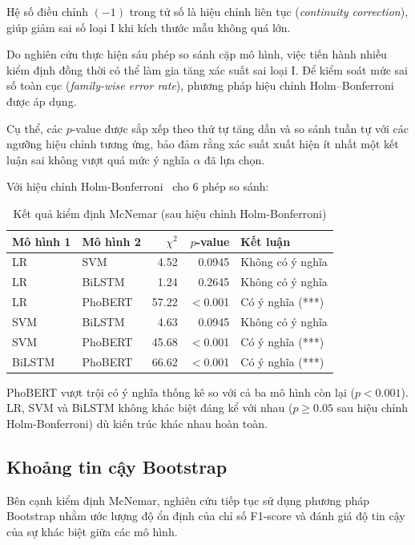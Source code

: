 \documentclass[12pt, a4paper]{report}
\newcommand{\phobert}{PhoBERT\xspace}
\newcommand{\mcnLrSvmChi}{4.52}
\newcommand{\mcnLrSvmP}{0.0945}
\newcommand{\mcnLrBilstmChi}{1.24}
\newcommand{\mcnLrBilstmP}{0.2645}
\newcommand{\mcnLrPhobertChi}{57.22}
\newcommand{\mcnSvmBilstmChi}{4.63}
\newcommand{\mcnSvmBilstmP}{0.0945}
\newcommand{\mcnSvmPhobertChi}{45.68}
\newcommand{\mcnBilstmPhobertChi}{66.62}
\begin{document}
Hệ số điều chỉnh $(-1)$ trong tử số là hiệu chỉnh liên tục 
(\textit{continuity correction}), giúp giảm sai số loại I 
khi kích thước mẫu không quá lớn.

Do nghiên cứu thực hiện sáu phép so sánh cặp mô hình, việc tiến hành nhiều kiểm định 
đồng thời có thể làm gia tăng xác suất sai loại I. 
Để kiểm soát mức sai số toàn cục (\textit{family-wise error rate}), 
phương pháp hiệu chỉnh Holm--Bonferroni được áp dụng.

Cụ thể, các $p$-value được sắp xếp theo thứ tự tăng dần và so sánh tuần tự 
với các ngưỡng hiệu chỉnh tương ứng, bảo đảm rằng xác suất xuất hiện ít nhất 
một kết luận sai không vượt quá mức ý nghĩa $\alpha$ đã lựa chọn.

Với hiệu chỉnh Holm-Bonferroni~\cite{holm1979} cho 6 phép so sánh:

\begin{table}[H]
\centering
\caption{Kết quả kiểm định McNemar (sau hiệu chỉnh Holm-Bonferroni)}
\label{tab:mcnemar}
\begin{tabular}{llrrl}
\toprule
\textbf{Mô hình 1} & \textbf{Mô hình 2} & \textbf{$\chi^2$} & \textbf{$p$-value} & \textbf{Kết luận} \\
\midrule
LR      & SVM     & \mcnLrSvmChi  & \mcnLrSvmP    & Không có ý nghĩa \\
LR      & BiLSTM  & \mcnLrBilstmChi  & \mcnLrBilstmP    & Không có ý nghĩa \\
LR      & PhoBERT & \mcnLrPhobertChi & $<$0.001  & Có ý nghĩa (***) \\
SVM     & BiLSTM  & \mcnSvmBilstmChi  & \mcnSvmBilstmP    & Không có ý nghĩa \\
SVM     & PhoBERT & \mcnSvmPhobertChi & $<$0.001  & Có ý nghĩa (***) \\
BiLSTM  & PhoBERT & \mcnBilstmPhobertChi & $<$0.001  & Có ý nghĩa (***) \\
\bottomrule
\end{tabular}
\end{table}

\phobert vượt trội có ý nghĩa thống kê so với cả ba mô hình còn lại ($p < 0.001$). LR, SVM và BiLSTM không khác biệt đáng kể với nhau ($p \geq 0.05$ sau hiệu chỉnh Holm-Bonferroni) dù kiến trúc khác nhau hoàn toàn.

\subsection{Khoảng tin cậy Bootstrap}
Bên cạnh kiểm định McNemar, nghiên cứu tiếp tục sử dụng phương pháp 
Bootstrap nhằm ước lượng độ ổn định của chỉ số F1-score và đánh giá 
độ tin cậy của sự khác biệt giữa các mô hình.
\end{document}
